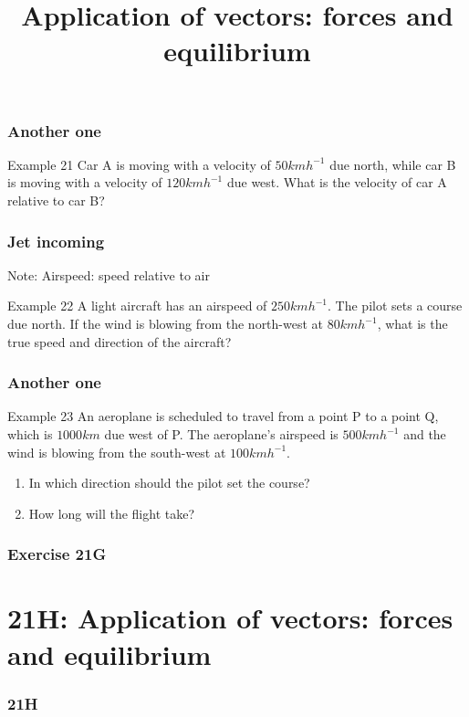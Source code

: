 \documentclass[
	11pt, %
]{beamer}
\newcommand{\blank}{\begin{frame}\end{frame}}
\begin{document}
\begin{frame}[t]
    \frametitle{Another one}
    \begin{block}{Example 21}
        Car A is moving with a velocity of $50 kmh^{-1}$ due north, while car B is moving with a
        velocity of $120 kmh^{-1}$ due west. What is the velocity of car A relative to car B?
    \end{block}
\end{frame}
\blank

\begin{frame}[t]
    \frametitle{Jet incoming}
    Note: \alert{Airspeed}: speed relative to air
    \begin{block}{Example 22}
        A light aircraft has an airspeed of $250 kmh^{-1}$. The pilot sets a course due north. If the
        wind is blowing from the north-west at $80 kmh^{-1}$, what is the true speed and direction of
        the aircraft?
    \end{block}
\end{frame}
\blank

\begin{frame}[t]
    \frametitle{Another one}
    \begin{block}{Example 23}
        An aeroplane is scheduled to travel from a point P to a point Q, which is $1000 km$
        due west of P. The aeroplane's airspeed is $500 kmh^{-1}$ and the wind is blowing from the
        south-west at $100 kmh^{-1}$.
        \begin{enumerate}
            \item In which direction should the pilot set the course?
            \item How long will the flight take?
        \end{enumerate}
    \end{block}
\end{frame}
\blank

\begin{frame}
    \frametitle{Exercise 21G}
\end{frame}


\section{21H: Application of vectors: forces and equilibrium}
\begin{frame}
    \frametitle{21H}
    \begin{center}
        \title{Application of vectors: forces and equilibrium}
        \maketitle
    \end{center}
\end{frame}
\end{document}
